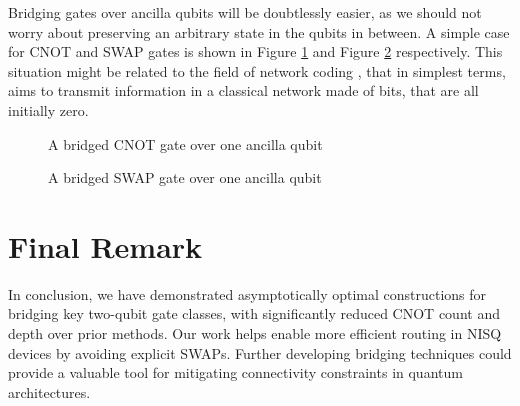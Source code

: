 Bridging gates over ancilla qubits will be doubtlessly easier, as we should not worry about preserving an arbitrary state in the qubits in between. A simple case for CNOT and SWAP gates is shown in Figure \ref{fig:bridged-cnot-w-ancilla} and Figure \ref{fig:bridged-swap-ancilla} respectively. This situation might be related to the field of network coding \cite{ho2008}, that in simplest terms, aims to transmit information in a classical network made of bits, that are all initially zero.

\begin{figure}[h!]
  \label{fig:bridged-cnot-w-ancilla}
  \centering
  \caption{A bridged CNOT gate over one ancilla qubit}
\end{figure}

\begin{figure}[h!]
  \label{fig:bridged-swap-ancilla}
  \centering
  \caption{A bridged SWAP gate over one ancilla qubit}
\end{figure}

\section{Final Remark}

In conclusion, we have demonstrated asymptotically optimal constructions for bridging key two-qubit gate classes, with significantly reduced CNOT count and depth over prior methods. Our work helps enable more efficient routing in NISQ devices by avoiding explicit SWAPs. Further developing bridging techniques could provide a valuable tool for mitigating connectivity constraints in quantum architectures.